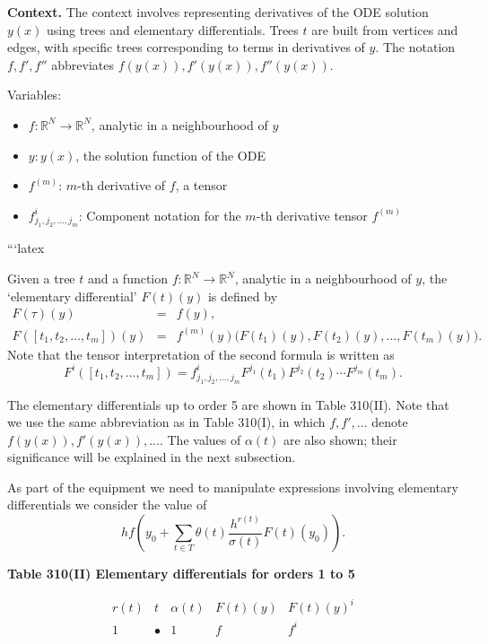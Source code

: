 \noindent\textbf{Context.}
The context involves representing derivatives of the ODE solution \(y(x)\) using trees and elementary differentials. Trees \(t\) are built from vertices and edges, with specific trees corresponding to terms in derivatives of \(y\). The notation \(f, f', f''\) abbreviates \(f(y(x)), f'(y(x)), f''(y(x))\).

Variables:
\begin{itemize}
    \item \(f: \mathbb{R}^{N} \to \mathbb{R}^{N}\), analytic in a neighbourhood of \(y\)
    \item \(y: y(x)\), the solution function of the ODE
    \item \(f^{(m)}\): \(m\)-th derivative of \(f\), a tensor
    \item \(f_{j_{1}, j_{2}, \dots, j_{m}}^{i}\): Component notation for the \(m\)-th derivative tensor \(f^{(m)}\)
\end{itemize}

```latex
\begin{definition}

  \label{def:310A}
Given a tree $t$ and a function $f : \mathbb{R}^N \to \mathbb{R}^N$, analytic in a neighbourhood of $y$, the `elementary differential' $F(t)(y)$ is defined by
\[
\begin{array}{rcl}
F(\tau)(y) & = & f(y), \\[4pt]
F([t_1, t_2, \dots, t_m])(y) & = & f^{(m)}(y)\bigl(F(t_1)(y), F(t_2)(y), \dots, F(t_m)(y)\bigr).
\end{array}
\]
Note that the tensor interpretation of the second formula is written as
\[
F^i([t_1, t_2, \dots, t_m]) = f^{i}_{j_1, j_2, \dots, j_m} F^{j_1}(t_1) F^{j_2}(t_2) \cdots F^{j_m}(t_m).
\]

The elementary differentials up to order 5 are shown in Table 310(II). Note that we use the same abbreviation as in Table 310(I), in which $f, f', \dots$ denote $f(y(x)), f'(y(x)), \dots$. The values of $\alpha(t)$ are also shown; their significance will be explained in the next subsection.

As part of the equipment we need to manipulate expressions involving elementary differentials we consider the value of
\[
h f\!\left( y_0 + \sum_{t \in T} \theta(t) \frac{h^{r(t)}}{\sigma(t)} F(t)(y_0) \right).
\]

\begin{center}
\textbf{Table 310(II) \quad Elementary differentials for orders 1 to 5}
\end{center}
\[
\begin{array}{cccc}
r(t) & t & \alpha(t) & F(t)(y) & F(t)(y)^i \\
1 & \bullet & 1 & f & f^i
\end{array}
\]
\end{definition}

